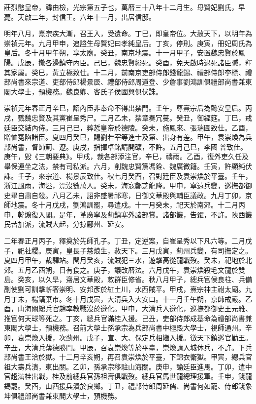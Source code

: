 
\begin{pinyinscope}
莊烈愍皇帝，諱由檢，光宗第五子也，萬曆三十八年十二月生。母賢妃劉氏，早薨。天啟二年，封信王。六年十一月，出居信邸。

明年八月，熹宗疾大漸，召王入，受遺命。丁巳，即皇帝位。大赦天下，以明年為崇禎元年。九月甲申，追謚生母賢妃曰孝純皇后。丁亥，停刑。庚寅，冊妃周氏為皇后。冬十月甲午朔，享太廟。癸丑，南京地震。十一月甲子，安置魏忠賢於鳳陽。戊辰，撤各邊鎮守內臣。己巳，魏忠賢縊死。癸酉，免天啟時逮死諸臣贓，釋其家屬。癸巳，黃立極致仕。十二月，前南京吏部侍郎錢龍錫、禮部侍郎李標、禮部尚書來宗道、吏部侍郎楊景辰、禮部侍郎周道登、少詹事劉鴻訓俱禮部尚書兼東閣大學士，預機務。魏良卿、客氏子侯國興俱伏誅。

崇禎元年春正月辛巳，詔內臣非奉命不得出禁門。壬午，尊熹宗后為懿安皇后。丙戌，戮魏忠賢及其黨崔呈秀尸。二月乙未，禁章奏冗蔓。癸丑，御經筵。丁巳，戒廷臣交結內侍。三月己巳，葬悊皇帝於德陵。癸未，施鳳來、張瑞圖致仕。乙酉，贈恤冤陷諸臣。夏四月癸巳，賜劉若宰等進士及第、出身有差。甲午，袁崇煥為兵部尚書，督師薊、遼。庚戌，指揮卓銘請開礦，不許。五月己巳，李國普致仕。庚午，毀《三朝要典》。甲戌，裁各部添注官，辛巳，禱雨。乙酉，復外吏久任及舉保連坐之法，禁有司私派。六月，削魏忠賢黨馮銓、魏廣微籍。壬寅，許顯純伏誅。壬子，來宗道、楊景辰致仕。秋七月癸酉，召對廷臣及袁崇煥於平臺。壬午，浙江風雨，海溢，漂沒數萬人。癸未，海寇鄭芝龍降。甲申，寧遠兵變，巡撫都御史畢自肅自殺。八月乙未，詔非盛暑祁寒，日御文華殿與輔臣議政。九月丁卯，京師地震。冬十月戊戌，劉鴻訓罷，尋遣戍。十一月癸未，祀天於南郊。十二月丙申，韓爌復入閣。是年，革廣寧及薊鎮塞外諸部賞。諸部饑，告糴，不許。陜西饑民苦加派，流賊大起，分掠鄜州、延安。

二年春正月丙子，釋奠於先師孔子。丁丑，定逆案，自崔呈秀以下凡六等。二月戊子，祀社稷。庚寅，皇長子慈烺生，赦天下。三月戊寅，薊州兵變，有司撫定之。夏四月甲午，裁驛站。閏月癸亥，流賊犯三水，遊擊高從龍戰歿。癸未，祀地於北郊。五月乙酉朔，日有食之。庚子，議改曆法。六月戊午，袁崇煥殺毛文龍於雙島。癸亥，以久旱，齋居文華殿，敕群臣修省。秋八月甲子，總兵官侯良柱、兵備副使劉可訓擊斬奢崇明、安邦彥於紅土川，水西賊平。甲戌，熹宗神主祔太廟。九月丁未，楊鎬棄市。冬十月戊寅，大清兵入大安口。十一月壬午朔，京師戒嚴。乙酉，山海關總兵官趙率教戰沒於遵化。甲申，大清兵入遵化，巡撫都御史王元雅、推官何天球等死之。丁亥，總兵官滿桂入援。己丑，吏部侍郎成基命為禮部尚書兼東閣大學士，預機務。召前大學士孫承宗為兵部尚書中極殿大學士，視師通州。辛卯，袁崇煥入援，次薊州。戊子，宣、大、保定兵相繼入援。徵天下鎮巡官勤王。辛丑，大清兵薄德勝門。甲辰，召袁崇煥等於平臺，崇煥請入城休兵，不許。下兵部尚書王洽於獄。十二月辛亥朔，再召袁崇煥於平臺，下錦衣衛獄。甲寅，總兵官祖大壽兵潰，東出關。乙卯，孫承宗移駐山海關。庚申，諭廷臣進馬。丁卯，遣中官趨滿桂出戰，桂及前總兵官孫祖壽俱戰歿。總兵官馬世龍總理援軍。壬申，錢龍錫罷。癸酉，山西援兵潰於良鄉。丁丑，禮部侍郎周延儒、尚書何如寵、侍郎錢象坤俱禮部尚書兼東閣大學士，預機務。


\end{pinyinscope}
